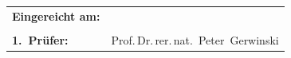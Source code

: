 \vfill

\begin{tabular}{ll}
  \textbf{Eingereicht am:} & \printdate{\finaldate}\\
  \\
  \textbf{1.~Prüfer:} & Prof.\,Dr.\,rer.\,nat.~Peter~Gerwinski \\
\end{tabular}
